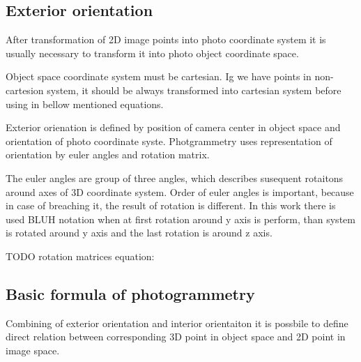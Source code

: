 \documentclass[a4paper,12pt]{report}
\begin{document}
\subsection{Exterior orientation}

After transformation of 2D image points into photo coordinate system it is usually necessary to transform it into photo object coordinate space.


Object space coordinate system must be cartesian. Ig we have points in non-cartesion system, it should be always transformed into cartesian 
system before using in bellow mentioned equations.


Exterior orienation is defined by position of camera center in object space and orientation of photo coordinate syste.
Photgrammetry uses representation of orientation by euler angles and rotation matrix.

The euler angles are group of three angles, which describes susequent rotaitons
 around axes of 3D coordinate system. 
 Order of euler angles is important, because in case of breaching it, the result of rotation is different. 
 In this work there is used BLUH notation when at first rotation around y axis is 
 perform, than system is rotated around y axis and the last rotation is around z axis.
 
 TODO rotation matrices equation:
 
\subsection{Basic formula of photogrammetry}

Combining of exterior orientation and interior orientaiton it is possbile to define 
direct relation between corresponding 3D point in object space and 2D point
in image space.
\end{document}
